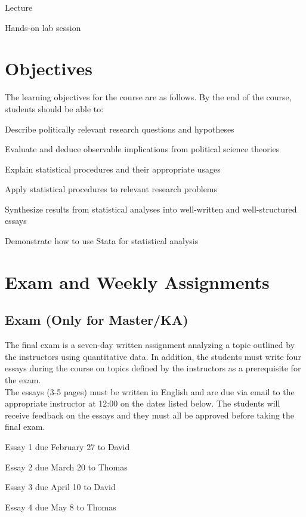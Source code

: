 \documentclass[11pt,a4paper]{article}
\begin{document}
\begin{itemize*}
\item Lecture %
\item Hands-on lab session %
\end{itemize*}


\clearpage
\section{Objectives}
The learning objectives for the course are as follows. By the end of the course, students should be able to:

\begin{enumerate*}
\item Describe politically relevant research questions and hypotheses
\item Evaluate and deduce observable implications from political science theories 
\item Explain statistical procedures and their appropriate usages
\item Apply statistical procedures to relevant research problems
\item Synthesize results from statistical analyses into well-written and well-structured essays
\item Demonstrate how to use Stata for statistical analysis
\end{enumerate*}

\section{Exam and Weekly Assignments}

\subsection{Exam (Only for Master/KA)}
The final exam is a seven-day written assignment analyzing a topic outlined by the instructors using quantitative data. In addition, the students must write four essays during the course on topics defined by the instructors as a prerequisite for the exam.\\

The essays (3-5 pages) must be written in English and are due via email to the appropriate instructor at 12:00 on the dates listed below. The students will receive feedback on the essays and they must all be approved before taking the final exam.

\begin{enumerate*}
\item Essay 1 due February 27 to David %
\item Essay 2 due March 20 to Thomas %
\item Essay 3 due April 10 to David %
\item Essay 4 due May 8 to Thomas %
\end{enumerate*}
\end{document}
